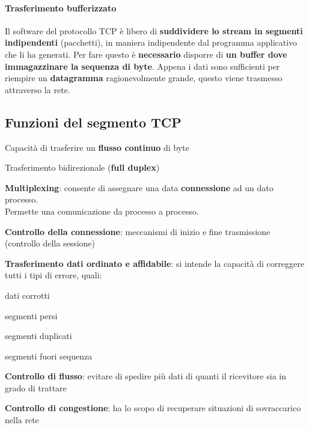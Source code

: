 \documentclass[10pt]{article}
\begin{document}
\paragraph{Trasferimento bufferizzato} Il software del protocollo TCP è libero di \textbf{suddividere lo stream in segmenti indipendenti} (pacchetti), in maniera indipendente dal programma applicativo che li ha generati. Per fare questo è \textbf{necessario} disporre di \textbf{un buffer dove immagazzinare la sequenza di byte}. Appena i dati sono sufficienti per riempire un \textbf{datagramma} ragionevolmente grande, questo viene trasmesso attraverso la rete.
\subsection{Funzioni del segmento TCP}
\begin{list}{}{Funzioni base per il trasferimento di dati:}
\item Capacità di trasferire un \textbf{flusso continuo} di byte
\item Trasferimento bidirezionale (\textbf{full duplex})
\item \textbf{Multiplexing}: consente di assegnare una data \textbf{connessione} ad un dato processo.\\Permette una comunicazione da processo a processo.
\item \textbf{Controllo della connessione}: meccanismi di inizio e fine trasmissione (controllo della sessione)
\item \textbf{Trasferimento dati ordinato e affidabile}: si intende la capacità di correggere tutti i tipi di errore, quali:
	\begin{list}{-}{}
	\item dati corrotti
	\item segmenti persi
	\item segmenti duplicati
	\item segmenti fuori sequenza
	\end{list}
\item \textbf{Controllo di flusso}: evitare di spedire più dati di quanti il ricevitore sia in grado di trattare
\item \textbf{Controllo di congestione}: ha lo scopo di recuperare situazioni di sovraccarico nella rete
\end{list}
\pagebreak
\end{document}
